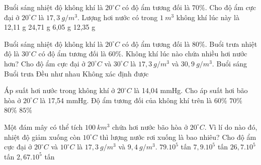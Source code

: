 \begin{vidu}%
	Buổi sáng nhiệt độ không khí là $20^\circ C$ có độ ẩm tương đối là $70\%$. Cho độ ẩm cực đại ở $20^\circ C$ là $17,3\ g/m^3$. Lượng hơi nước có trong $1\ m^3$ không khí lúc này là
	\choice
	{12,11 g}
	{24,71 g}
	{6,05 g}
	{12,35 g}
\end{vidu}
\begin{vidu}%
	Buổi sáng nhiệt độ không khí là $20^\circ C$ có độ ẩm tương đối là $80\%$. Buổi trưa nhiệt độ là $30^\circ C$ có độ ẩm tương đối là $60\%$. Không khí lúc nào chứa nhiều hơi nước hơn? Cho độ ẩm cực đại ở $20^\circ C$ và $30^\circ C$ là $17,3\ g/m^3$ và $30,9\ g/m^3$.
	\choice
	{Buổi sáng}
	{\True Buổi trưa}
	{Đều như nhau}
	{Không xác định được}
\end{vidu}
\begin{vidu}%
	Áp suất hơi nước trong không khí ở $20^\circ C$ là 14,04 mmHg. Cho áp suất hơi bão hòa ở $20^\circ C$ là 17,54 mmHg. Độ ẩm tương đối của không khí trên là
	\choice
	{$60\%$}
	{$70\%$}
	{$80\%$}
	{$85\%$}
\end{vidu}

\begin{vidu}%
	Một đám mây có thể tích $100\ km^3$ chứa hơi nước bão hòa ở $20^\circ C$. Vì lí do nào đó, nhiệt độ giảm xuống còn $10^\circ C$ thì lượng nước rơi xuống là bao nhiêu? Cho độ ẩm cực đại ở $20^\circ C$ và $10^\circ C$ là $17,3\ g/m^3$ và $9,4\ g/m^3$.
	\choice
	{$79.10^5$ tấn}
	{\True $7,9.10^5$ tấn}
	{$26,7.10^5$ tấn}
	{$2,67.10^5$ tấn}
\end{vidu}